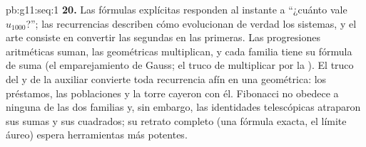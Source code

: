 \begin{solution}{pb:g11:seq:1}
\textbf{20.} Las fórmulas explícitas responden al instante a ``¿cuánto
vale $u_{1000}$?''; las recurrencias describen cómo evolucionan de verdad
los sistemas, y el arte consiste en convertir las segundas en las
primeras. Las progresiones aritméticas suman, las geométricas multiplican,
y cada familia tiene su fórmula de suma (el emparejamiento de Gauss; el
truco de multiplicar por la ). El truco del  y de la
 auxiliar convierte toda recurrencia afín en una geométrica: los
préstamos, las poblaciones y la torre cayeron con él. Fibonacci no obedece
a ninguna de las dos familias y, sin embargo, las identidades telescópicas
atraparon sus sumas y sus cuadrados; su retrato completo (una fórmula
exacta, el límite áureo) espera herramientas más potentes.
\end{solution}
